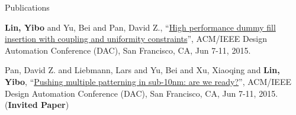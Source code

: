 \begin{rSection}{Publications}
\begin{description}[font=\normalfont]
{}
        

\item[{[C2]}]{
        \textbf{Lin, Yibo} and Yu, Bei and Pan, David Z., 
    ``\href{http://dl.acm.org/citation.cfm?id=2744769.2744850}{High performance dummy fill insertion with coupling and uniformity constraints}'', 
    ACM/IEEE Design Automation Conference (DAC), San Francisco, CA, Jun 7-11, 2015.
    
}
        

\item[{[C1]}]{
        Pan, David Z. and Liebmann, Lars and Yu, Bei and Xu, Xiaoqing and \textbf{Lin, Yibo}, 
    ``\href{http://dl.acm.org/citation.cfm?id=2744769.2747940}{Pushing multiple patterning in sub-10nm: are we ready?}'', 
    ACM/IEEE Design Automation Conference (DAC), San Francisco, CA, Jun 7-11, 2015.
    (\textbf{Invited Paper})
}
        

\end{description}
    

\end{rSection}



